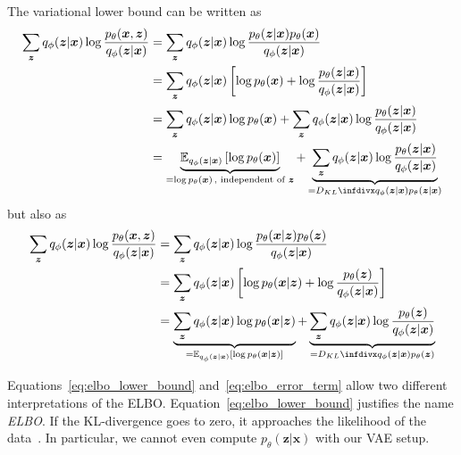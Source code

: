 The variational lower bound can be written as
\begin{align}
    \sum_{\bm{z}} q_\phi(\bm{z}|\bm{x}) \log \frac{p_\theta(\bm{x},\bm{z})}{q_\phi(\bm{z}|\bm{x})} &= \sum_{\bm{z}} q_\phi(\bm{z}|\bm{x}) \log \frac{p_\theta(\bm{z}|\bm{x})p_\theta(\bm{x})}{q_\phi(\bm{z}|\bm{x})}\\
    &= \sum_{\bm{z}} q_\phi(\bm{z}|\bm{x}) \left[ \log p_\theta(\bm{x}) + \log \frac{p_\theta(\bm{z}|\bm{x})}{q_\phi(\bm{z}|\bm{x})} \right]\\
    &= \sum_{\bm{z}} q_\phi(\bm{z}|\bm{x})\log p_\theta(\bm{x}) + \sum_{\bm{z}} q_\phi(\bm{z}|\bm{x})\log \frac{p_\theta(\bm{z}|\bm{x})}{q_\phi(\bm{z}|\bm{x})}\\
    &= \underbrace{\mathbb{E}_{q_\phi(\bm{z}|\bm{x})} \left[ \log p_\theta(\bm{x}) \right]}_{=\log p_\theta(\bm{x})\, \text{, independent of $\bm{z}$}} + \underbrace{\sum_{\bm{z}} q_\phi(\bm{z}|\bm{x})\log \frac{p_\theta(\bm{z}|\bm{x})}{q_\phi(\bm{z}|\bm{x})}}_{=\kldiv{q_\phi(\bm{z}|\bm{x})}{p_\theta(\bm{z}|\bm{x})}} \label{eq:elbo_lower_bound}
\end{align}
but also as
\begin{align}
    \sum_{\bm{z}} q_\phi(\bm{z}|\bm{x}) \log \frac{p_\theta(\bm{x},\bm{z})}{q_\phi(\bm{z}|\bm{x})} &= \sum_{\bm{z}} q_\phi(\bm{z}|\bm{x}) \log \frac{p_\theta(\bm{x}|\bm{z})p_\theta(\bm{z})}{q_\phi(\bm{z}|\bm{x})}\\
    &= \sum_{\bm{z}} q_\phi(\bm{z}|\bm{x}) \left[ \log p_\theta(\bm{x}|\bm{z}) + \log \frac{p_\theta(\bm{z})}{q_\phi(\bm{z}|\bm{x})} \right]\\
    &= \underbrace{\sum_{\bm{z}} q_\phi(\bm{z}|\bm{x})\log p_\theta(\bm{x}|\bm{z})}_{=\mathbb{E}_{q_\phi(\bm{z}|\bm{x})}\left[ \log p_\theta(\bm{x}|\bm{z}) \right]} + \underbrace{\sum_{\bm{z}} q_\phi(\bm{z}|\bm{x})\log \frac{p_\theta(\bm{z})}{q_\phi(\bm{z}|\bm{x})}}_{=\kldiv{q_\phi(\bm{z}|\bm{x})}{p_\theta(\bm{z})}} \label{eq:elbo_error_term}
\end{align}

Equations~\ref{eq:elbo_lower_bound} and~\ref{eq:elbo_error_term} allow two different interpretations of the \ac{ELBO}.
Equation~\ref{eq:elbo_lower_bound} justifies the name \textit{\acl{ELBO}}.
If the \ac{KL-divergence} goes to zero, it approaches the likelihood of the data~\citep[p. 18]{kingma2019introduction}.
In particular, we cannot even compute $p_\theta(\bm{z}|\bm{x})$ with our \ac{VAE} setup.

